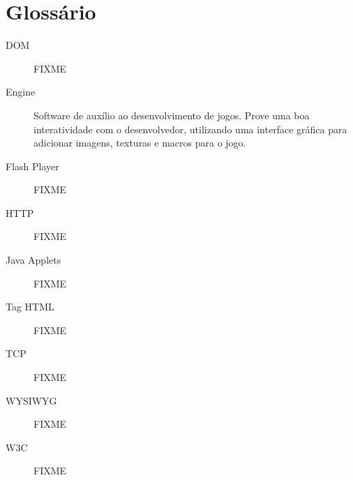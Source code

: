 
\section*{Glossário}

\begin{description}
\item[DOM ] FIXME
\item[Engine ] Software de auxílio ao desenvolvimento de jogos. Prove
uma boa interatividade com o desenvolvedor, utilizando uma interface
gráfica para adicionar imagens, texturas e macros para o jogo.
\item[Flash Player ] FIXME
\item[HTTP ] FIXME
\item[Java Applets ] FIXME
\item[Tag HTML ] FIXME
\item[TCP ] FIXME
\item[WYSIWYG ] FIXME
\item[W3C ] FIXME

\end{description}

\newpage
